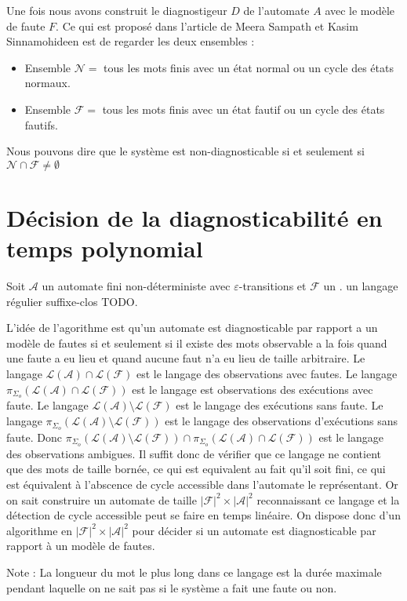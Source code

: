 \documentclass[10pt,a4paper]{article}
\begin{document}
        Une fois nous avons construit le diagnostigeur $D$ de l'automate $A$ avec le mod\`ele de faute $F$. Ce qui est propos\'e dans l'article de Meera Sampath et Kasim Sinnamohideen est de regarder les deux ensembles :
        \begin{itemize}
             \item Ensemble $\mathcal{N} = $ tous les mots finis avec un \'etat normal ou un cycle des \'etats normaux. 
             \item Ensemble $\mathcal{F} = $ tous les mots finis avec un \'etat fautif ou un cycle des \'etats fautifs. 

        \end{itemize}

    Nous pouvons dire que le syst\`eme est non-diagnosticable si et seulement si $\mathcal{N}\cap \mathcal{F} \neq \emptyset$

\section{D\'ecision de la diagnosticabilit\'e en temps polynomial}

Soit $\mathcal A$ un automate fini non-d\'eterministe avec $\varepsilon$-transitions et $\mathcal F$ un . un langage r\'egulier suffixe-clos TODO.

L'id\'ee de l'agorithme est qu'un automate est diagnosticable par rapport a un mod\`ele de fautes si et seulement si il existe des mots observable a la fois quand une faute a eu lieu et quand aucune faut n'a eu lieu de taille arbitraire. Le langage $\mathcal L (\mathcal A) \cap \mathcal L(\mathcal F)$ est le langage des observations avec fautes. Le langage $\pi_{\Sigma_o}(\mathcal L (\mathcal A) \cap \mathcal L(\mathcal F))$ est le langage est observations des ex\'ecutions avec faute. Le langage $\mathcal L(\mathcal A) \setminus \mathcal L(\mathcal F)$ est le langage des ex\'ecutions sans faute. Le langage $\pi_{\Sigma_o}(\mathcal L(\mathcal A) \setminus \mathcal L(\mathcal F))$ est le langage des observations d'ex\'ecutions sans faute. Donc $\pi_{\Sigma_o}(\mathcal L(\mathcal A) \setminus \mathcal L(\mathcal F)) \cap \pi_{\Sigma_o}(\mathcal L (\mathcal A) \cap \mathcal L(\mathcal F))$ est le langage des observations ambigues. Il suffit donc de v\'erifier que ce langage ne contient que des mots de taille born\'ee, ce qui est equivalent au fait qu'il soit fini, ce qui est \'equivalent \`a l'abscence de cycle accessible dans l'automate le repr\'esentant. Or on sait construire un automate de taille $|\mathcal F|^2 \times |\mathcal A|^2$ reconnaissant ce langage et la d\'etection de cycle accessible peut se faire en temps lin\'eaire. On dispose donc d'un algorithme en $|\mathcal F|^2 \times |\mathcal A|^2$ pour d\'ecider si un automate est diagnosticable par rapport \`a un mod\`ele de fautes.

Note : La longueur du mot le plus long dans ce langage est la dur\'ee maximale pendant laquelle on ne sait pas si le syst\`eme a fait une faute ou non.
\end{document}

